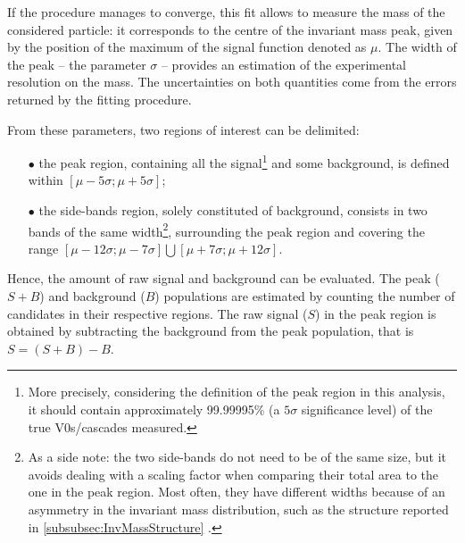 If the procedure manages to converge, this fit allows to measure the mass of the considered particle: it corresponds to the centre of the invariant mass peak, given by the position of the maximum of the signal function denoted as $\mu$. The width of the peak -- the parameter $\sigma$ -- provides an estimation of the experimental resolution on the mass. The uncertainties on both quantities come from the errors returned by the fitting procedure.

From these parameters, two regions of interest can be delimited:
\begin{itemize}
\item[$\bullet$] the peak region, containing all the signal\footnote{More precisely, considering the definition of the peak region in this analysis, it should contain approximately 99.99995\% (\ie a $5 \sigma$ significance level) of the true V0s/cascades measured.} and some background, is defined within $\left[ \mu - 5 \sigma ; \mu + 5 \sigma \right]$;
\item[$\bullet$] the side-bands region, solely constituted of background, consists in two bands of the same width\footnote{As a side note: the two side-bands do not need to be of the same size, but it avoids dealing with a scaling factor when comparing their total area to the one in the peak region. Most often, they have different widths because of an asymmetry in the invariant mass distribution, such as the structure reported in \Sec\ref{subsubsec:InvMassStructure} \cite{alicecollaborationProductionLightflavorHadrons2021}.}, surrounding the peak region and covering the range $\left[ \mu - 12 \sigma ; \mu - 7 \sigma \right] \bigcup \left[ \mu + 7 \sigma ; \mu + 12 \sigma \right]$.
\end{itemize}
Hence, the amount of raw signal and background can be evaluated. The peak ($S+B$) and background ($B$) populations are estimated by counting the
number of candidates in their respective regions. The raw signal ($S$) in the peak region is obtained by subtracting the background from the peak population, that is\break $S=(S+B)-B$.

